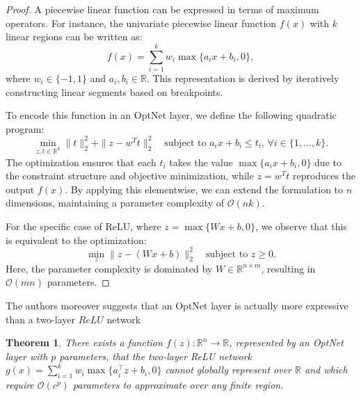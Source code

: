 \documentclass{article}
\newtheorem{theorem}{Theorem}
\begin{document}
\begin{proof}
    A piecewise linear function can be expressed in terms of maximum operators. For instance, the univariate piecewise linear function $f(x)$ with $k$ linear regions can be written as:
    \[
    f(x) = \sum_{i=1}^k w_i \max\{a_i x + b_i, 0\},
    \]
    where $w_i \in \{-1, 1\}$ and $a_i, b_i \in \mathbb{R}$. This representation is derived by iteratively constructing linear segments based on breakpoints.

    To encode this function in an OptNet layer, we define the following quadratic program:
    \[
    \min_{z, t \in \mathbb{R}^k} \|t\|_2^2 + \|z - w^T t\|_2^2 \quad \text{subject to } a_i x + b_i \leq t_i, \, \forall i \in \{1, \ldots, k\}.
    \]
    The optimization ensures that each $t_i$ takes the value $\max\{a_i x + b_i, 0\}$ due to the constraint structure and objective minimization, while $z = w^T t$ reproduces the output $f(x)$. By applying this elementwise, we can extend the formulation to $n$ dimensions, maintaining a parameter complexity of $\mathcal{O}(nk)$.

    For the specific case of ReLU, where $z = \max\{Wx + b, 0\}$, we observe that this is equivalent to the optimization:
    \[
    \min_{z} \|z - (Wx + b)\|_2^2 \quad \text{subject to } z \geq 0.
    \]
    Here, the parameter complexity is dominated by $W \in \mathbb{R}^{n \times m}$, resulting in $\mathcal{O}(mn)$ parameters.
\end{proof}

The authors moreover suggests that an OptNet layer is actually more expressive than a two-layer $ReLU$ network

\begin{theorem}
    There exists a function $f(z): \mathbb{R}^n \to \mathbb{R}$, represented by an OptNet layer with $p$ parameters, that the two-layer ReLU network $g(x) = \sum_{i=1}^k w_i \max\{a_i^{\top} z + b_i, 0\}$ cannot globally represent over $\mathbb{R}$ and which require $\mathcal{O}(c^p)$ parameters to approximate over any finite region.
\end{theorem}
\end{document}
